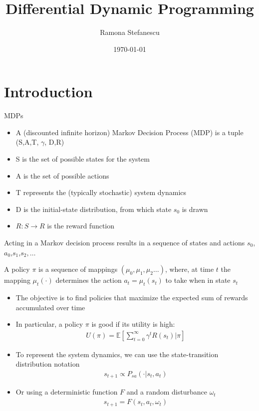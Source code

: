 \documentclass[10pt,mathserif]{beamer}
\title{\large \bfseries Differential Dynamic Programming}
\author{Ramona Stefanescu\\[3ex]
}
\date{\today}
\begin{document}
\frame{
\thispagestyle{empty}
\titlepage
}

\section{Introduction}

\begin{frame}{MDPs}
\begin{itemize}
\item A (discounted infinite horizon) Markov Decision Process (MDP) is a tuple (S,A,T, $\gamma$, D,R)
\item S is the set of possible states for the system
\item A is the set of possible actions
\item T represents the (typically stochastic) system dynamics
\item D is the initial-state distribution, from which state $s_0$ is drawn
\item $R:S\rightarrow R$ is the reward function 
\end{itemize}
Acting in a Markov decision process results in a sequence of states and actions $s_0$,$a_0$,$s_1$,$s_2,\dots$
\end{frame}

\begin{frame}
A policy $\pi$ is a sequence of mappings $(\mu_0, \mu_1,\mu_2 \dots)$, where, at time $t$ the mapping $\mu_t(\cdot)$ determines the action $a_t =\mu_t(s_t)$ to take when in state $s_t$ 
\begin{itemize}
\item The objective is to find policies that maximize the expected sum of rewards accumulated over time
\item In particular, a policy $\pi$ is good if its utility is high:
\begin{align}
U(\pi) = \mathbb{E}[\sum_{t=0}^{\infty}\gamma^tR(s_t) | \pi]
\end{align}
\item To represent the system dynamics, we can use the state-transition distribution notation
\begin{align}
s_{t+1} \propto P_{sa}(\cdot|s_t,a_t)
\end{align}
\item Or using a deterministic function $F$ and a random disturbance $\omega_t$
\begin{align}
s_{t+1} = F(s_t, a_t, \omega_t)
\end{align}
\end{itemize}
\end{frame}
\end{document}
